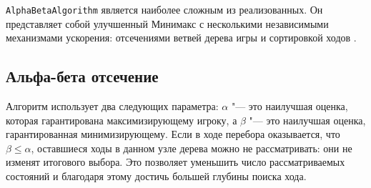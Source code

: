 \documentclass[a4paper,12pt]{diplom}
\renewcommand{\le}{\leqslant}
\begin{document}
\texttt{AlphaBetaAlgorithm} является наиболее сложным из реализованных. Он представляет собой улучшенный Минимакс с несколькими независимыми механизмами ускорения: отсечениями ветвей дерева игры и сортировкой ходов \cite{Russell:2021}.

\subsection*{Альфа-бета отсечение}

Алгоритм использует два следующих параметра: $\alpha$ "--- это наилучшая оценка, которая гарантирована максимизирующему игроку, а $\beta$ "--- это наилучшая оценка, гарантированная минимизирующему. Если в ходе перебора оказывается, что $\beta \le \alpha$, оставшиеся ходы в данном узле дерева можно не рассматривать: они не изменят итогового выбора. Это позволяет уменьшить число рассматриваемых состояний и благодаря этому достичь большей глубины поиска хода.
\end{document}
